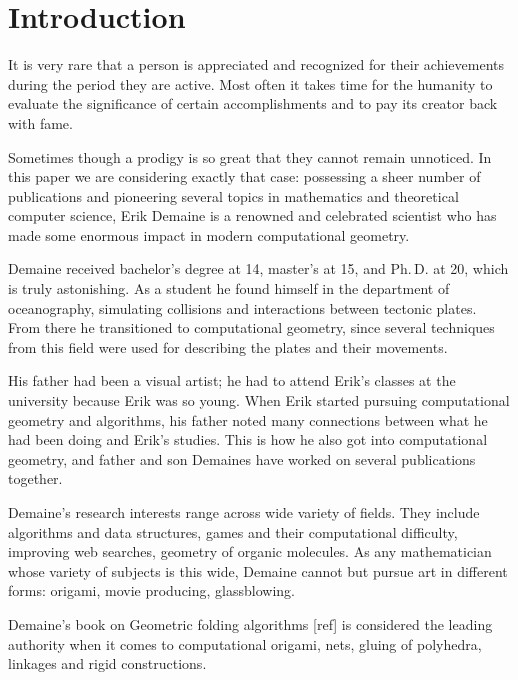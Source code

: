 \documentclass[a4paper,12pt]{article}
\begin{document}
\restoregeometry

\newpage \maketitle \vspace{1cm}

\tableofcontents \vfill \eject

\section{Introduction}

It is very rare that a person is appreciated and recognized for their achievements during the period they are active. Most often it takes time for the humanity to evaluate the significance of certain accomplishments and to pay its creator back with fame.

Sometimes though a prodigy is so great that they cannot remain unnoticed. In this paper we are considering exactly that case: possessing a sheer number of publications and pioneering several topics in mathematics and theoretical computer science, Erik Demaine is a renowned and celebrated scientist who has made some enormous impact in modern computational geometry.

Demaine received bachelor's degree at 14, master's at 15, and Ph.\,D. at 20, which is truly astonishing. As a student he found himself in the department of oceanography, simulating collisions and interactions between tectonic plates. From there he transitioned to computational geometry, since several techniques from this field were used for describing the plates and their movements.

His father had been a visual artist; he had to attend Erik's classes at the university because Erik was so young. When Erik started pursuing computational geometry and algorithms, his father noted many connections between what he had been doing and Erik's studies. This is how he also got into computational geometry, and father and son Demaines have worked on several publications together.

Demaine's research interests range across wide variety of fields. They include algorithms and data structures, games and their computational difficulty, improving web searches, geometry of organic molecules. As any mathematician whose variety of subjects is this wide, Demaine cannot but pursue art in different forms: origami, movie producing, glassblowing.

Demaine's book on Geometric folding algorithms [ref] is considered the leading authority when it comes to computational origami, nets, gluing of polyhedra, linkages and rigid constructions.
\end{document}
